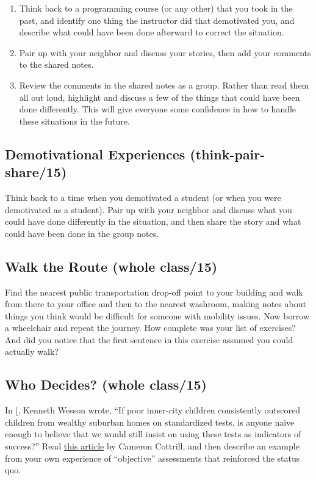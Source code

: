\begin{enumerate}
\item
  Think back to a programming course (or any other) that you took in
  the past, and identify one thing the instructor did that demotivated
  you, and describe what could have been done afterward to correct the
  situation.
\item
  Pair up with your neighbor and discuss your stories, then add your
  comments to the shared notes.
\item
  Review the comments in the shared notes as a group. Rather than read
  them all out loud, highlight and discuss a few of the things that
  could have been done differently. This will give everyone some
  confidence in how to handle these situations in the future.
\end{enumerate}

\subsection{Demotivational Experiences (think-pair-share/15)}\label{demotivational-experiences-think-pair-share15}

Think back to a time when you demotivated a student (or when you were
demotivated as a student). Pair up with your neighbor and discuss what
you could have done differently in the situation, and then share the
story and what could have been done in the group notes.

\subsection{Walk the Route (whole class/15)}\label{walk-the-route-whole-class15}

Find the nearest public transportation drop-off point to your building
and walk from there to your office and then to the nearest washroom,
making notes about things you think would be difficult for someone with
mobility issues. Now borrow a wheelchair and repeat the journey. How
complete was your list of exercises? And did you notice that the first
sentence in this exercise assumed you could actually walk?

\subsection{Who Decides? (whole class/15)}\label{who-decides-whole-class15}

In {[}\protect[\hyperlink{b:Litt2004}{Litt2004}]{]}, Kenneth Wesson wrote, ``If poor inner-city
children consistently outscored children from wealthy suburban homes
on standardized tests, is anyone naive enough to believe that we would
still insist on using these tests as indicators of success?'' Read
\href{https://mobile.nytimes.com/2016/04/10/upshot/why-talented-black-and-hispanic-students-can-go-undiscovered.html}{this article} by Cameron Cottrill, and then
describe an example from your own experience of ``objective''
assessments that reinforced the status quo.

